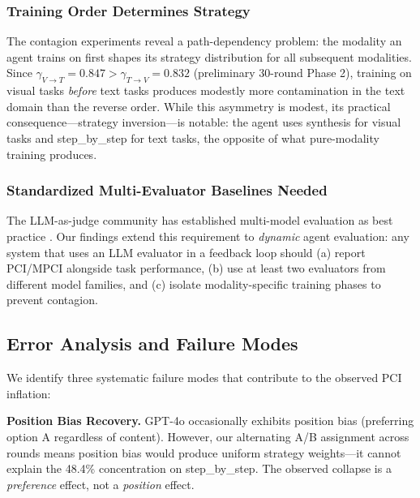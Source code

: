 \documentclass[11pt,a4paper]{article}
\begin{document}
\subsubsection{Training Order Determines Strategy}

The contagion experiments reveal a path-dependency problem: the modality an agent trains on first shapes its strategy distribution for all subsequent modalities. Since $\gamma_{V\to T} = 0.847 > \gamma_{T\to V} = 0.832$ (preliminary 30-round Phase 2), training on visual tasks \textit{before} text tasks produces modestly more contamination in the text domain than the reverse order. While this asymmetry is modest, its practical consequence---strategy inversion---is notable: the agent uses synthesis for visual tasks and step\_by\_step for text tasks, the opposite of what pure-modality training produces.

\subsubsection{Standardized Multi-Evaluator Baselines Needed}

The LLM-as-judge community has established multi-model evaluation as best practice \cite{zheng2023judging}. Our findings extend this requirement to \textit{dynamic} agent evaluation: any system that uses an LLM evaluator in a feedback loop should (a) report PCI/MPCI alongside task performance, (b) use at least two evaluators from different model families, and (c) isolate modality-specific training phases to prevent contagion.

\subsection{Error Analysis and Failure Modes}

We identify three systematic failure modes that contribute to the observed PCI inflation:

\textbf{Position Bias Recovery.} GPT-4o occasionally exhibits position bias (preferring option A regardless of content). However, our alternating A/B assignment across rounds means position bias would produce uniform strategy weights---it cannot explain the 48.4\% concentration on step\_by\_step. The observed collapse is a \textit{preference} effect, not a \textit{position} effect.
\end{document}
